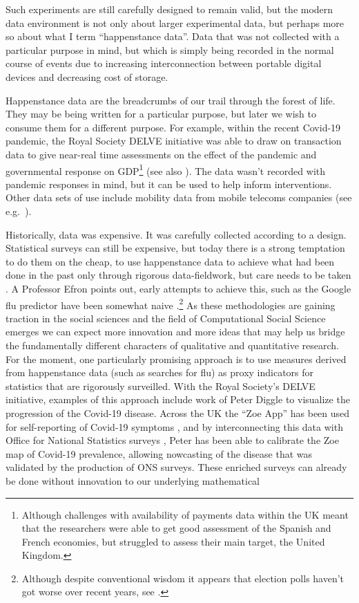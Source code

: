 \documentclass[a4paperpaper,]{article}
\begin{document}
Such experiments are still carefully designed to remain valid, but the
modern data environment is not only about larger experimental data, but
perhaps more so about what I term ``happenstance data''. Data that was
not collected with a particular purpose in mind, but which is simply
being recorded in the normal course of events due to increasing
interconnection between portable digital devices and decreasing cost of
storage.

Happenstance data are the breadcrumbs of our trail through the forest of
life. They may be being written for a particular purpose, but later we
wish to consume them for a different purpose. For example, within the
recent Covid-19 pandemic, the Royal Society DELVE initiative
\citep{Delve:economics20} was able to draw on transaction data to give
near-real time assessments on the effect of the pandemic and
governmental response on GDP\footnote{Although challenges with
  availability of payments data within the UK meant that the researchers
  were able to get good assessment of the Spanish and French economies,
  but struggled to assess their main target, the United Kingdom.} (see
also \citet{Carvalho:tracking20}). The data wasn't recorded with
pandemic responses in mind, but it can be used to help inform
interventions. Other data sets of use include mobility data from mobile
telecoms companies (see e.g.~\citet{Oliver-mobile20}).

Historically, data was expensive. It was carefully collected according
to a design. Statistical surveys can still be expensive, but today there
is a strong temptation to do them on the cheap, to use happenstance data
to achieve what had been done in the past only through rigorous
data-fieldwork, but care needs to be taken \citep{Wang-forecasting15}. A
Professor Efron points out, early attempts to achieve this, such as the
Google flu predictor have been somewhat naive
\citep{Ginsberg:detecting09, Halevy:unreasonable09}.\footnote{Although
  despite conventional wisdom it appears that election polls haven't got
  worse over recent years, see \citet{Will-election18}.} As these
methodologies are gaining traction in the social sciences
\citep{Salganik:bitbybit18} and the field of Computational Social
Science \citep{Alvarez:computational16} emerges we can expect more
innovation and more ideas that may help us bridge the fundamentally
different characters of qualitative and quantitative research. For the
moment, one particularly promising approach is to use measures derived
from happenstance data (such as searches for flu) as proxy indicators
for statistics that are rigorously surveilled. With the Royal Society's
DELVE initiative, examples of this approach include work of Peter Diggle
to visualize the progression of the Covid-19 disease. Across the UK the
``Zoe App'' has been used for self-reporting of Covid-19 symptoms
\citep{Menni:tracking20}, and by interconnecting this data with Office
for National Statistics surveys \citep{ONS:covid19infection20}, Peter
has been able to calibrate the Zoe map of Covid-19 prevalence, allowing
nowcasting of the disease that was validated by the production of ONS
surveys. These enriched surveys can already be done without innovation
to our underlying mathematical
\end{document}
